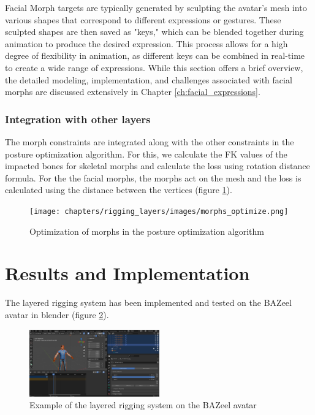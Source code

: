 \documentclass[../../main.tex]{subfiles}
\begin{document}
Facial Morph targets are typically generated by sculpting the avatar's mesh into various shapes that correspond to different expressions or gestures. These sculpted shapes are then saved as "keys," which can be blended together during animation to produce the desired expression. This process allows for a high degree of flexibility in animation, as different keys can be combined in real-time to create a wide range of expressions. While this section offers a brief overview, the detailed modeling, implementation, and challenges associated with facial morphs are discussed extensively in Chapter \ref{ch:facial_expressions}.

\subsubsection{Integration with other layers}
\label{ch:rigging_layers:proc_rig_signing_avatars:morph_constraints:intergation}

The morph constraints are integrated along with the other constraints in the posture optimization algorithm. For this, we calculate the FK values of the impacted bones for skeletal morphs and calculate the loss using rotation distance formula. For the the facial morphs, the morphs act on the mesh and the loss is calculated using the distance between the vertices (figure \ref{fig:morphs_optimize}).

\begin{figure}
    \centering
    \texttt{[image: chapters/rigging\_layers/images/morphs\_optimize.png]}
    \caption{Optimization of morphs in the posture optimization algorithm}
    \label{fig:morphs_optimize}
\end{figure}

\section{Results and Implementation}
\label{ch:rigging_layers:results}

The layered rigging system has been implemented and tested on the BAZeel avatar in blender (figure \ref{fig:layers_example}).

\begin{figure}
    \centering
    \includegraphics[width=0.5\textwidth]{chapters/rigging_layers/images/layers_example.png}
    \caption{Example of the layered rigging system on the BAZeel avatar}
    \label{fig:layers_example}
\end{figure}
\end{document}
